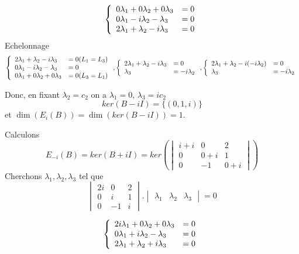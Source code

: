 \documentclass[]{book}
\theoremstyle{definition}
\begin{document}
$$
\left\{ 
\begin{array}{l l}
0\lambda_{1} + 0\lambda_{2} + 0\lambda_{3} & = 0\\
0\lambda_{1} - i\lambda_{2} - \lambda_{3} & = 0\\
2\lambda_{1} + \lambda_{2} - i\lambda_{3} & = 0\\
\end{array}
\right. 
$$ 
Echelonnage
$$
\left\{ 
\begin{array}{l l}
2\lambda_{1} + \lambda_{2} - i\lambda_{3} & = 0 (L_1=L_3)\\
0\lambda_{1} - i\lambda_{2} - \lambda_{3} & = 0\\
0\lambda_{1} + 0\lambda_{2} + 0\lambda_{3} & = 0 (L_3=L_1)\\
\end{array}
\right. 
,
\left\{ 
\begin{array}{l l}
2\lambda_{1} + \lambda_{2} - i\lambda_{3} & = 0\\
\lambda_{3} & = -i\lambda_{2}\\
\end{array}
\right. 
,
\left\{ 
\begin{array}{l l}
2\lambda_{1} + \lambda_{2} - i(-i\lambda_{2}) & = 0\\
\lambda_{3} & = -i\lambda_{2}\\
\end{array}
\right. 
$$ 

Donc, en fixant $\lambda_2 = c_2$ on a $\lambda_1 = 0$, $\lambda_3 = ic_2$
$$ker(B-iI) = \{(0,1,i)\}$$ 
et $\dim(E_{i}(B))= \dim(ker(B-iI)) = 1$.

Calculons
$$E_{-i}(B) = ker(B +iI) = ker\left(\begin{vmatrix} i+i & 0 & 2 \\ 0 & 0+i & 1 \\ 0 & -1 & 0+i \end{vmatrix}\right)$$
Cherchons $\lambda_1,\lambda_2,\lambda_3$  tel que
$$\begin{vmatrix} 2i & 0 & 2 \\ 0 & i & 1 \\ 0 & -1 & i \end{vmatrix}.\begin{vmatrix} \lambda_1 & \lambda_2 & \lambda_3 \end{vmatrix} = 0$$

$$
\left\{ 
\begin{array}{l l}
2i\lambda_{1} + 0\lambda_{2} + 0\lambda_{3} & = 0\\
0\lambda_{1} + i\lambda_{2} - \lambda_{3} & = 0\\
2\lambda_{1} + \lambda_{2} + i\lambda_{3} & = 0\\
\end{array}
\right. 
$$ 
\end{document}
